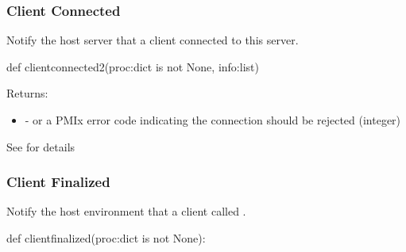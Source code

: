 \subsubsection{Client Connected}

\summary

Notify the host server that a client connected to this server.

\format

\pyspecificstart
\begin{codepar}
def clientconnected2(proc:dict is not None, info:list)
\end{codepar}
\pyspecificend

\begin{arglist}
\end{arglist}

Returns:
\begin{itemize}
    \item {} -  or a \ac{PMIx} error code indicating the connection should be rejected (integer)
\end{itemize}

See  for details


\subsubsection{Client Finalized}

\summary

Notify the host environment that a client called .

\format

\pyspecificstart
\begin{codepar}
def clientfinalized(proc:dict is not None):
\end{codepar}
\pyspecificend

\begin{arglist}
\end{arglist}

